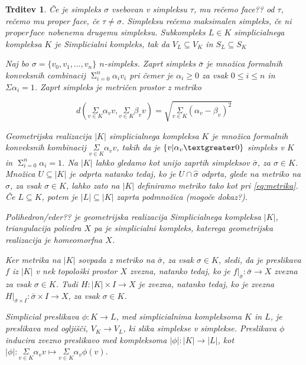 \documentclass[a4paper,12pt]{article}
\DeclareRobustCommand{\si}{
    \bar{\sigma}
}
\newcommand\mymathop[1]{\mathop{\operatorname{#1}}}
\theoremstyle{definition}
\theoremstyle{plain}
\theoremstyle{definition}
\theoremstyle{plain}
\newtheorem{trditev}{Trditev}
\theoremstyle{plain}
\theoremstyle{plain}
\theoremstyle{plain}
\begin{document}
\begin{trditev}
Če je simpleks $\sigma$ vsebovan  v simpleksu $\tau$, mu rečemo \textit{face??} od $\tau$, rečemo mu \textit{proper face}, če $\tau\neq \sigma$. Simpleksu rečemo \textit{maksimalen simpleks}, če ni $proper face$ nobenemu drugemu simpleksu. Subkompleks $L\in K$ simplicialnega kompleksa $K$ je Simplicialni kompleks, tak da $V_L\subseteq V_K$ in $S_L\subseteq S_K$


Naj bo $\sigma = \{v_0,v_1,\ldots,v_n\}$ $n$-simpleks. Zaprt
simpleks $\bar{\sigma}$ je množica formalnih konveksnih combinacij $\mymathop{\Sigma}_{i=0}^{n}\alpha_i v_i$
pri čemer je $\alpha_i \ge 0$ za vsak $0\le i \le n$ in $\Sigma \alpha_i = 1$. Zaprt simpleks je metričen prostor z metriko

\begin{equation}
\label{eq:metrika}
d(\underset{v \in K}{\Sigma}\alpha_v v,\underset{v \in K}{\Sigma}\beta_v v) = \sqrt{\underset{v \in K}{\Sigma}(\alpha_v - \beta_v)^2}
\end{equation}

\textit{Geometrijska realizacija} $|K|$ simplicialnega kompleksa $K$ je 
množica formalnih konveksnih kombinacij $\underset{v \in K}{\Sigma}\alpha_v v$, takih da je $\{v | \alpha_v \textgreater 0\}$ simpleks v $K$ in $\mymathop{\Sigma}_{i=0}^{n}\alpha_i=1$.
Na $|K|$ lahko gledamo kot unijo zaprtih simpleksov $\bar{\sigma}$, za $\sigma \in K$. Množica $U\subseteq |K|$ je odprta natanko tedaj, ko je $U \cap \hat{\sigma}$ odprta, glede na metriko na $\hat{\sigma}$, za vsak $\sigma \in K$, lahko zato na $|K|$ definiramo metriko tako kot pri \ref{eq:metrika}. Če $L\subseteq K$, potem je $|L|\subseteq |K|$ zaprta podmnožica (mogoče dokaz?).

\textit{Polihedron/eder??} je geometrijska realizacija Simplicialnega kompleksa $|K|$, \textit{triangulacija} poliedra $X$ pa je simplicialni kompleks, katerega geometrijska realizacija je homeomorfna $X$.

Ker metrika na $|K|$ sovpada z metriko na $\bar{\sigma}$, za vsak $\sigma\in K$, sledi, da je preslikava $f$ iz $|K|$ v nek topološki prostor $X$ zvezna, natanko tedaj, ko je $f|_{\bar{\sigma}}: \bar{\sigma} \rightarrow X$ zvezna za vsak $\sigma\in K$. Tudi $H:|K|\times I \rightarrow X$ je zvezna, natanko tedaj, ko je zvezna $H|_{\si\times I}:\si\times I \rightarrow X$, za vsak $\sigma\in K$.


\textit{Simplicial preslikava} $\phi :K \rightarrow L$, med 
simplicialnima kompleksoma $K$ in $L$, je preslikava med 
ogljišči, $V_K \rightarrow V_L$, ki slika simplekse v 
simplekse. Preslikava $\phi$ inducira zvezno preslikavo med 
kompleksoma $|\phi| :|K| \rightarrow |L|$, kot $|\phi|:
\underset{v \in K}{\Sigma}\alpha_v v \mapsto
\underset{v \in K}{\Sigma}\alpha_v \phi(v)$.


\end{trditev}
\end{document}
